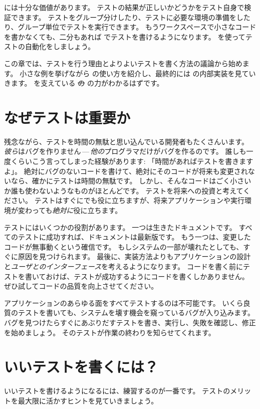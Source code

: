 \documentclass[a4paper,10pt,twoside]{book}
\begin{document}
\sunit には十分な価値があります。
テストの結果が正しいかどうかをテスト自身で検証できます。
テストをグループ分けしたり、テストに必要な環境の準備をしたり、グループ単位でテストを実行できます。
もうワークスペースで小さなコードを書かなくても、二分もあれば \sunit でテストを書けるようになります。
\sunit を使ってテストの自動化をしましょう。

この章では、テストを行う理由とよりよいテストを書く方法の議論から始めます。
小さな例を挙げながら \sunit の使い方を紹介し、最終的には \sunit の内部実装を見ていきます。
\sunit を支えている \st の  の力がわかるはずです。

\section{なぜテストは重要か}

残念ながら、テストを時間の無駄と思い込んでいる開発者もたくさんいます。
\emph{彼ら}はバグを作りません\,---\,\emph{他の}プログラマだけがバグを作るのです。
誰しも一度くらいこう言ってしまった経験があります: 「時間があればテストを書きますよ」。
絶対にバグのないコードを書けて、絶対にそのコードが将来も変更されないなら、確かにテストは時間の無駄です。
しかし、そんなコードはごく小さいか誰も使わないようなものがほとんどです。
テストを将来への投資と考えてください。
テストはすぐにでも役に立ちますが、将来アプリケーションや実行環境が変わっても\emph{絶対に}役に立ちます。

テストにはいくつかの役割があります。
一つは生きたドキュメントです。
すべてのテストに成功すれば、ドキュメントは最新版です。
もう一つは、変更したコードが無事動くという確信です。
もしシステムの一部が壊れたとしても、すぐに原因を見つけられます。
最後に、実装方法よりもアプリケーションの設計と\emph{ユーザとのインターフェース}を考えるようになります。
コードを書く前にテストを書いておけば、テストが成功するようにコードを書くしかありません。
ぜひ試してコードの品質を向上させてください。

アプリケーションのあらゆる面をすべてテストするのは不可能です。
いくら良質のテストを書いても、システムを壊す機会を窺っているバグが入り込みます。
バグを見つけたらすぐにあぶりだすテストを書き、実行し、失敗を確認し、修正を始めましょう。
そのテストが作業の終わりを知らせてくれます。

\section{いいテストを書くには？}

いいテストを書けるようになるには、練習するのが一番です。
テストのメリットを最大限に活かすヒントを見ていきましょう。
\end{document}
